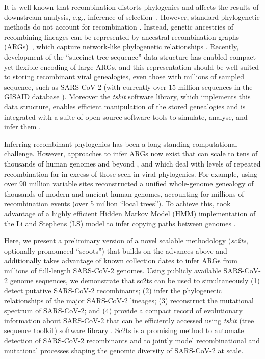 \documentclass{article}
\begin{document}
It is well known that recombination distorts phylogenies \citep{Schierup2000-fg}
and affects the results of downstream analysis, e.g., inference of
selection~\citep{Anisimova2003-vr}. However, standard phylogenetic methods do
not account for recombination
\citep[e.g.][]{Ronquist2012-zw,Minh2020-lr,Guindon2003-zd}. Instead,
genetic ancestries of recombining lineages can be represented by ancestral
recombination graphs (ARGs)~\citep{Griffiths1981-lw,Hudson1983-properties}, which
capture network-like phylogenetic relationships \citep{Gusfield2014-qw}. Recently,
development of the ``succinct tree sequence'' data
structure \citep{Kelleher2018-xc}  has enabled compact yet flexible
encoding of large ARGs, and this representation should be well-suited to storing
recombinant viral genealogies, even those with millions of sampled sequence,
such as SARS-CoV-2 (with currently over 15 million sequences in the GISAID database
\citep{Shu2017-hp}). Moreover the \emph{tskit} software library, which implements this
data structure, enables efficient manipulation of the stored genealogies and is
integrated with a suite of open-source software tools to simulate, analyse, and
infer them \citep{Baumdicker2022-ep,Kelleher2018-xc,Kelleher2019-ba,Wohns2022-th}.


Inferring recombinant phylogenies has been a long-standing computational challenge.
However, approaches to infer ARGs now exist that can scale to tens of
thousands of human genomes and beyond
\citep{Speidel2019-yh,Kelleher2019-ba,Zhang2021-lf,Schaefer2021-yg}, and which
deal with levels of repeated recombination far in excess of those seen in viral
phylogenies. For example, using over 90 million variable sites
\citet{Wohns2022-th} reconstructed a unified whole-genome genealogy of thousands
of modern and ancient human genomes, accounting for millions of recombination
events (over 5 million ``local trees''). To achieve this, \cite{Wohns2022-th}
took advantage of a highly efficient Hidden Markov Model (HMM) implementation
of the Li and Stephens (LS) model \citep{Li2003-ib} to infer copying paths between
genomes \citep{Kelleher2019-ba}.


Here, we present a preliminary version of a novel scalable methodology
(\emph{sc2ts}, optionally pronounced ``scoots'') that builds on the advances above
and additionally takes advantage of known collection dates to infer ARGs from millions
of full-length SARS-CoV-2 genomes. Using publicly available SARS-CoV-2 genome sequences,
we demonstrate that sc2ts can be used to simultaneously (1) detect putative SARS-CoV-2
recombinants; (2) infer the phylogenetic relationships of the major SARS-CoV-2 lineages;
(3) reconstruct the mutational spectrum of SARS-CoV-2; and (4) provide a compact record
of evolutionary information about SARS-CoV-2 that can be efficiently accessed using
\emph{tskit} (tree sequence toolkit) software library \citep{Kelleher2018-xc}.
Sc2ts is a promising method to automate detection of SARS-CoV-2 recombinants
and to jointly model recombinational and mutational processes shaping the genomic
diversity of SARS-CoV-2 at scale.
\end{document}
